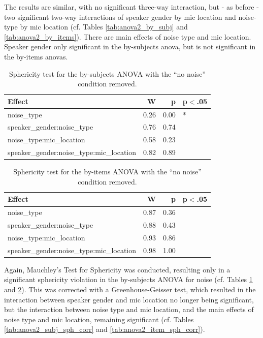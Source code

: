 \documentclass[dissertation,copyright]{uathesis}
\begin{document}
The results are similar, with no significant three-way interaction, but - as before - two significant two-way interactions of speaker gender by mic location and noise-type by mic location (cf. Tables \ref{tab:anova2_by_subj} and \ref{tab:anova2_by_items}).  There are main effects of noise type and mic location.  Speaker gender only significant in the by-subjects anova, but is not significant in the by-items anovas.

\begin{table}[ht]
\centering
\begin{tabular}{lrrl}
  \hline
Effect & W & p & p$<$.05 \\ 
  \hline
noise\_type & 0.26 & 0.00 & * \\ 
  speaker\_gender:noise\_type & 0.76 & 0.74 &  \\ 
  noise\_type:mic\_location & 0.58 & 0.23 &  \\ 
  speaker\_gender:noise\_type:mic\_location & 0.82 & 0.89 &  \\ 
   \hline
\end{tabular}
\caption{Sphericity test for the by-subjects ANOVA with the ``no noise'' condition removed.} 
\label{tab:anova2_subj_sph_test}
\end{table}
\begin{table}[ht]
\centering
\begin{tabular}{lrrl}
  \hline
Effect & W & p & p$<$.05 \\ 
  \hline
noise\_type & 0.87 & 0.36 &  \\ 
  speaker\_gender:noise\_type & 0.88 & 0.43 &  \\ 
  noise\_type:mic\_location & 0.93 & 0.86 &  \\ 
  speaker\_gender:noise\_type:mic\_location & 0.98 & 1.00 &  \\ 
   \hline
\end{tabular}
\caption{Sphericity test for the by-items ANOVA with the ``no noise'' condition removed.} 
\label{tab:anova2_item_sph_test}
\end{table}


Again, Mauchley's Test for Sphericity was conducted, resulting only in a significant sphericity violation in the by-subjects ANOVA for noise (cf. Tables \ref{tab:anova2_subj_sph_test} and \ref{tab:anova2_item_sph_test}).  This was corrected with a Greenhouse-Geisser test, which resulted in the interaction between speaker gender and mic location no longer being significant, but the interaction between noise type and mic location, and the main effects of noise type and mic location, remaining significant (cf. Tables \ref{tab:anova2_subj_sph_corr} and \ref{tab:anova2_item_sph_corr}).
\end{document}

